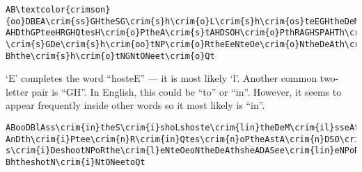 \begin{Answer}
\color{blue}
\begin{Verbatim}[commandchars=\\\{\}]
AB\textcolor{crimson}{oo}DBEA\crim{ss}GHtheSG\crim{s}h\crim{o}L\crim{s}h\crim{os}teEGHtheDeMGE\crim{ss}eAtN\crim{o}PtO\crim{o}HeDeBPees
AHDthGPteeHRGHQtesH\crim{o}PtheA\crim{s}tAHDSOH\crim{o}PthRAGHSPAHTh\crim{s}eMeHthEGRSeA\crim{s}t
\crim{s}GDe\crim{s}h\crim{oo}tNP\crim{o}RtheEeNteOe\crim{o}NtheDeAth\crim{s}heADASeeEGHeNP\crim{o}RthetPeethP\crim{o}Q
Bhthe\crim{s}h\crim{o}tNGNtONeet\crim{o}Qt
\end{Verbatim}
\color{black}
`E' completes the word ``hosteE'' --- it is most likely `l'.
Another common two-letter pair is ``GH''. In English, this could be ``to'' or ``in''.
However, it seems to appear frequently inside other words so it most likely is ``in''.
\color{blue}
\begin{Verbatim}[commandchars=\\\{\}]
ABooDBlAss\crim{in}theS\crim{i}shoLshoste\crim{lin}theDeM\crim{il}sseAtNoPtOo\crim{n}eDeBPees
AnDth\crim{i}Ptee\crim{n}R\crim{in}Qtes\crim{n}oPtheAstA\crim{n}DSO\crim{n}oPthRA\crim{in}SPA\crim{n}ThseMe\crim{n}th\crim{li}RSeAst
s\crim{i}DeshootNPoRthe\crim{l}eNteOeoNtheDeAthsheADASee\crim{lin}eNPoRthetPeethPoQ
BhtheshotN\crim{i}NtONeetoQt
\end{Verbatim}
\color{black}


\end{Answer}
